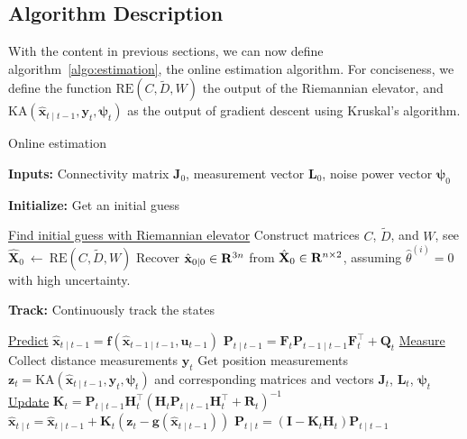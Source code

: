 \subsection{Algorithm Description}
With the content in previous sections, we can now define algorithm~\ref{algo:estimation}, the online estimation algorithm. For conciseness, we define the function $\text{RE}(C, \tilde{D}, W)$ the output of the Riemannian elevator, and $\text{KA}(\hat{\mathbf{x}}_{t \mid t-1}, \mathbf{y}_t, \bm{\psi}_t)$ as the output of gradient descent using Kruskal's algorithm. 
\begin{algorithm}
    \caption{Online estimation}\label{algo:estimation}
    \textbf{Inputs:} Connectivity matrix $\mathbf{J}_0$, measurement vector $\mathbf{L}_0$, noise power vector $\bm{\psi}_0$
    
    \textbf{Initialize:} Get an initial guess
    \begingroup{} %
    \begin{algorithmic}[1]
        \Statex \underline{Find initial guess with Riemannian elevator}
        \State Construct matrices $C$, $\tilde{D}$, and $W$, see \cite{R_elevator}
        \State $\hat{\mathbf{X}}_0 \ \leftarrow\ \text{RE}(C, \tilde{D}, W)$
        \State Recover $\hat{\mathbf{x}}_{0 \mid 0} \in \mathbf{R}^{3n}$ from $\hat{\mathbf{X}}_0 \in \mathbf{R}^{n \times 2}$, assuming $\hat{\theta}^{(i)} = 0$ with high uncertainty.
    \end{algorithmic}

    \textbf{Track:} Continuously track the states
    \begin{algorithmic}[1]
        \Statex \underline{Predict}
        \State $\hat{\mathbf{x}}_{t \mid t-1} = \mathbf{f}(\hat{\mathbf{x}}_{t-1 \mid t-1}, \mathbf{u}_{t-1})$
        \State $\mathbf{P}_{t \mid t-1} = \mathbf{F}_t \mathbf{P}_{t-1 \mid t-1} \mathbf{F}_t^\top + \mathbf{Q}_t$
        \Statex \underline{Measure}
        \State Collect distance measurements $\mathbf{y}_t$
        \State Get position measurements $\mathbf{z}_t = \text{KA}(\hat{\mathbf{x}}_{t \mid t-1}, \mathbf{y}_t, \bm{\psi}_t)$ and corresponding matrices and vectors $\mathbf{J}_t$, $\mathbf{L}_t$, $\bm{\psi}_t$
        \Statex \underline{Update}
        \State $\mathbf{K}_t = \mathbf{P}_{t \mid t-1} \mathbf{H}^\top_t (\mathbf{H}_t \mathbf{P}_{t \mid t-1} \mathbf{H}_t^\top + \mathbf{R}_t)^{-1}$
        \State $\hat{\mathbf{x}}_{t \mid t} = \hat{\mathbf{x}}_{t\mid t-1} + \mathbf{K}_t (\mathbf{z}_t - \mathbf{g}(\hat{\mathbf{x}}_{t \mid t-1}))$
        \State $\mathbf{P}_{t \mid t} = (\mathbf{I} - \mathbf{K}_t \mathbf{H}_t) \mathbf{P}_{t \mid t-1}$
    \end{algorithmic}
    \endgroup
\end{algorithm}